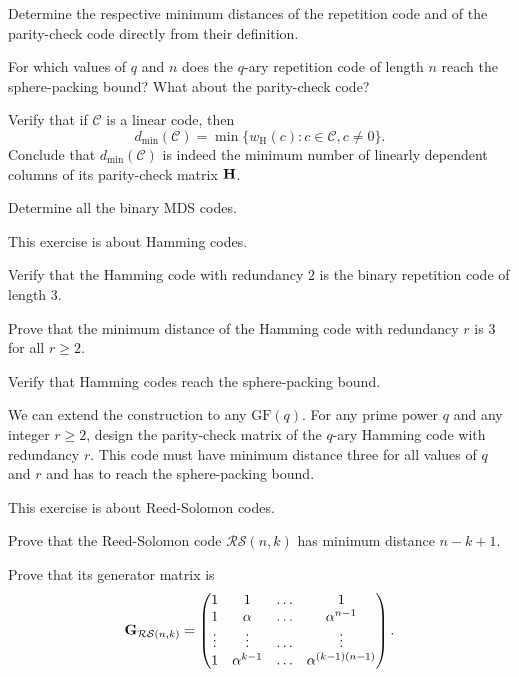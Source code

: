 \documentclass[a4paper, 11pt]{book}
\numberwithin{equation}{section}
\theoremstyle{plain}
\newcommand{\dmin}{d_{\min}}
\newcommand{\wH}{w_\mathrm{H}}
\newcommand{\GF}{\mathrm{GF}}
\renewcommand{\(}{\ldbrack}
\renewcommand{\)}{\rdbrack}
\begin{document}
\begin{exercises}
\item Determine the respective minimum distances of the repetition code and of the parity-check code directly from their definition.

\item For which values of $q$ and $n$ does the $q$-ary repetition code of length $n$ reach the sphere-packing bound? What about the parity-check code?


\item Verify that if $\mathcal{C}$ is a linear code, then 
\[
	\dmin(\mathcal{C}) = \min\{ \wH(c) : c \in \mathcal{C}, c \ne 0 \}.
\]
Conclude that $\dmin(\mathcal{C})$ is indeed the minimum number of linearly dependent columns of its parity-check matrix ${\bf H}$.

\item Determine all the binary MDS codes.

\item \label{exerc:Hamming_codes} This exercise is about Hamming codes.
\begin{exercises}
	\item Verify that the Hamming code with redundancy $2$ is the binary repetition code of length $3$.

	\item Prove that the minimum distance of the Hamming code with redundancy $r$ is $3$ for all $r \ge 2$.

	\item Verify that Hamming codes reach the sphere-packing bound.

	\item We can extend the construction to any $\GF(q)$. For any prime power $q$ and any integer $r \ge 2$, design the parity-check matrix of the $q$-ary Hamming code with redundancy $r$. This code must have minimum distance three for all values of $q$ and $r$ and has to reach the sphere-packing bound.
\end{exercises}

\item \label{exerc:RS} This exercise is about Reed-Solomon codes.
\begin{exercises}
	\item Prove that the Reed-Solomon code $\mathcal{RS}(n,k)$ has minimum distance $n-k+1$.

	\item Prove that its generator matrix is
	\[
	{\bf G}_{\mathcal{RS}(n,k)} = \begin{pmatrix}
	1 & 1 & \dots & 1\\
	1 & \alpha & \dots & \alpha^{n-1}\\
	\vdots & \vdots & \dots & \vdots\\
	1 & \alpha^{k-1} & \dots & \alpha^{(k-1)(n-1)}
	\end{pmatrix}.
	\]


\end{exercises}
\end{exercises}
\end{document}
